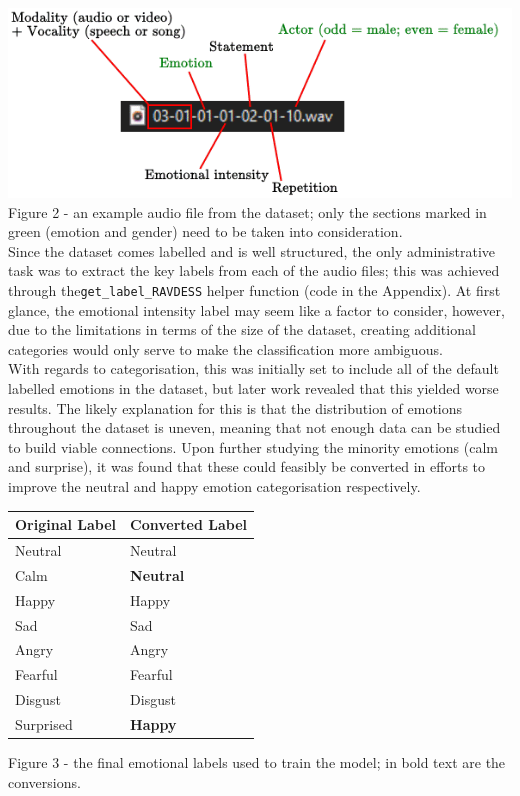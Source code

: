 \documentclass[12pt]{article}
\newcommand{\code}[1]{\colorbox{light-gray}{\texttt{#1}}}
\begin{document}
\includegraphics{figure_2_dataset_audio_example}
Figure 2 - an example audio file from the dataset; only the sections marked in green (emotion and gender) need to be taken into consideration.
\\


\noindent Since the dataset comes labelled and is well structured, the only administrative task was to extract the key labels from each of the audio files; this was achieved through the\code{get\_label\_RAVDESS} helper function (code in the Appendix). At first glance, the emotional intensity label may seem like a factor to consider, however, due to the limitations in terms of the size of the dataset, creating additional categories would only serve to make the classification more ambiguous.
\\

\noindent With regards to categorisation, this was initially set to include all of the default labelled emotions in the dataset, but later work revealed that this yielded worse results. The likely explanation for this is that the distribution of emotions throughout the dataset is uneven, meaning that not enough data can be studied to build viable connections. Upon further studying the minority emotions (calm and surprise), it was found that these could feasibly be converted in efforts to improve the neutral and happy emotion categorisation respectively. 
\\
\begin{center}
\begin{tabularx}{\textwidth}{ |X|X| }
\hline 
  \textbf{Original Label}  & \textbf{Converted Label} \\
  \hline
  Neutral & Neutral \\
  \hline
  Calm & \textbf{Neutral} \\
  \hline
  Happy & Happy \\
  \hline
  Sad & Sad \\
  \hline
  Angry & Angry \\
  \hline
  Fearful & Fearful \\
  \hline
  Disgust & Disgust \\
  \hline
  Surprised & \textbf{Happy} \\
  \hline
\end{tabularx}
\end{center}
Figure 3 - the final emotional labels used to train the model; in bold text are the conversions.
\\
\end{document}

